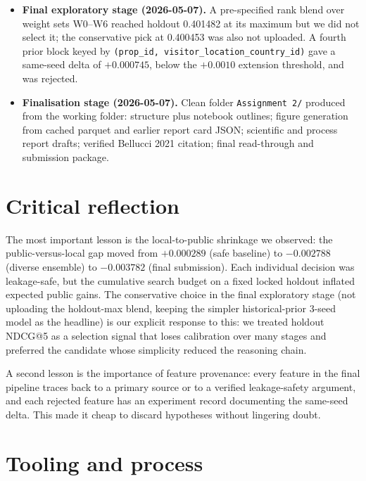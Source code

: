 \documentclass[a4paper,10pt]{article}
\begin{document}
\begin{itemize}[leftmargin=*]
    leakage-safe historical priors over \texttt{prop\_id},
    \texttt{srch\_destination\_id}, and the pair, with K-fold
    encoding. Three-seed score-average holdout 0.400682 (first
    local result above 0.4). Manual Kaggle upload, public
    0.39690 (final selected submission).
\item \textbf{Final exploratory stage (2026-05-07).} A
    pre-specified rank blend over weight sets W0--W6 reached
    holdout 0.401482 at its maximum but we did not select it; the
    conservative pick at 0.400453 was also not uploaded. A fourth
    prior block keyed by
    \texttt{(prop\_id, visitor\_location\_country\_id)} gave a
    same-seed delta of $+0.000745$, below the $+0.0010$ extension
    threshold, and was rejected.
\item \textbf{Finalisation stage (2026-05-07).} Clean folder
    \texttt{Assignment~2/} produced from the working folder:
    structure plus notebook outlines; figure generation from
    cached parquet and earlier report card JSON; scientific and
    process report drafts; verified Bellucci 2021 citation; final
    read-through and submission package.
\end{itemize}

\section*{Critical reflection}

The most important lesson is the local-to-public shrinkage we
observed: the public-versus-local gap moved from $+0.000289$
(safe baseline) to $-0.002788$ (diverse ensemble) to $-0.003782$
(final submission). Each individual decision was leakage-safe, but
the cumulative search budget on a fixed locked holdout inflated
expected public gains. The conservative choice in the final
exploratory stage (not uploading the holdout-max blend, keeping the
simpler historical-prior 3-seed model as the headline) is our
explicit response to this: we treated holdout NDCG@5 as a selection
signal that loses calibration over many stages and preferred the
candidate whose simplicity reduced the reasoning chain.

A second lesson is the importance of feature provenance: every
feature in the final pipeline traces back to a primary source or
to a verified leakage-safety argument, and each rejected feature
has an experiment record documenting the same-seed delta. This
made it cheap to discard hypotheses without lingering doubt.

\section*{Tooling and process}
\end{document}
